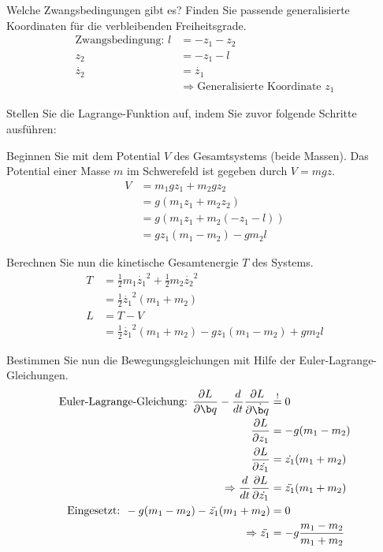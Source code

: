 \begin{enumeralph}
	\item Welche Zwangsbedingungen gibt es?  Finden Sie passende generalisierte Koordinaten für die verbleibenden Freiheitsgrade.
	\begin{align*}
	\text{Zwangsbedingung: }l &= -z_1 -z_2\\
	z_2&=-z_1-l\\
	\dot{z_2}&=\dot{z_1}\\
	&\Rightarrow \text{Generalisierte Koordinate }z_1
	\end{align*}
	\item Stellen Sie die Lagrange-Funktion auf, indem Sie zuvor folgende Schritte ausführen:
	\begin{enumeroman}
		\item Beginnen Sie mit dem Potential $V$ des Gesamtsystems (beide Massen).  Das Potential einer Masse $m$ im Schwerefeld ist gegeben durch $V=mgz$.
		\begin{align*}
		V&=m_1gz_1+m_2gz_2\\
		&=g(m_1z_1+m_2z_2)\\
		&=g(m_1z_1+m_2(-z_1-l))\\
		&=gz_1(m_1-m_2)-gm_2l
		\end{align*}
		\item Berechnen Sie nun die kinetische Gesamtenergie $T$ des Systems.
		\begin{align*}
		T&=\frac{1}{2}m_1\dot{z_1}^2+\frac{1}{2}m_2\dot{z_2}^2\\
		&=\frac{1}{2}\dot{z_1}^2(m_1+m_2)\\
		L&=T-V\\
		&=\frac{1}{2}\dot{z_1}^2(m_1+m_2) -gz_1(m_1-m_2)+gm_2l
		\end{align*}
	\end{enumeroman}
\item Bestimmen Sie nun die Bewegungsgleichungen mit Hilfe der Euler-Lagrange-Gleichungen.
\begin{align*}
\text{Euler-Lagrange-Gleichung: } \frac{\partial L}{\partial\q}-\frac{d}{dt}\frac{\partial L}{\partial \dot{\q}}&\overset{!}{=}0\\
\frac{\partial L}{\partial z_1}&=-g(m_1-m_2)\\
\frac{\partial L}{\partial \dot{z_1}}&=\dot{z_1}(m_1+m_2)\\
\Rightarrow \frac{d}{dt}\frac{\partial L}{\partial \dot{z_1}}&=\ddot{z_1}(m_1+m_2)\\
\text{Eingesetzt: }-g(m_1-m_2)-\ddot{z_1}(m_1+m_2)&=0\\
\Rightarrow \ddot{z_1}&=-g\frac{m_1-m_2}{m_1+m_2}
\end{align*}
\end{enumeralph}

